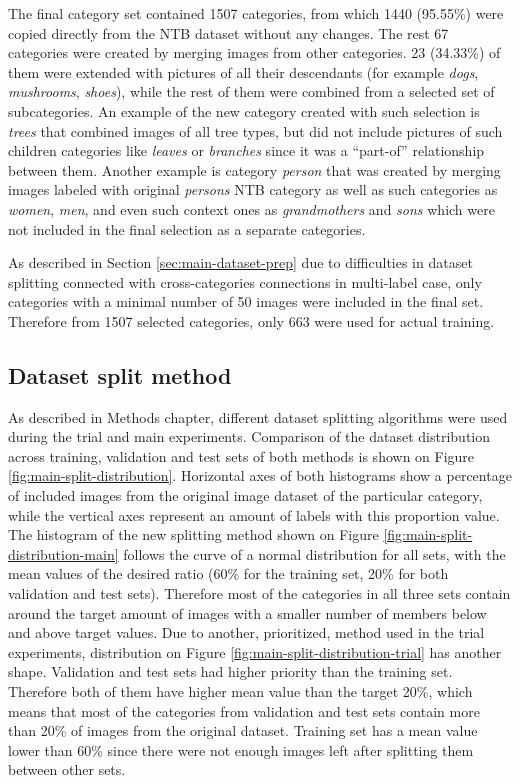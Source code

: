     The final category set contained 1507 categories, from which 1440 (95.55\%) were copied directly from the NTB dataset without any changes. The rest 67 categories were created by merging images from other categories. 23 (34.33\%) of them were extended with pictures of all their descendants (for example \textit{dogs}, \textit{mushrooms}, \textit{shoes}), while the rest of them were combined from a selected set of subcategories. An example of the new category created with such selection is \textit{trees} that combined images of all tree types, but did not include pictures of such children categories like \textit{leaves} or \textit{branches} since it was a ``part-of'' relationship between them. Another example is category \textit{person} that was created by merging images labeled with original \textit{persons} NTB category as well as such categories as \textit{women}, \textit{men}, and even such context ones as \textit{grandmothers} and \textit{sons} which were not included in the final selection as a separate categories.
    
    As described in Section \ref{sec:main-dataset-prep} due to difficulties in dataset splitting connected with cross-categories connections in multi-label case, only categories with a minimal number of 50 images were included in the final set. Therefore from 1507 selected categories, only 663 were used for actual training.

\subsection{Dataset split method}
    \label{sec:split-comparison}
    As described in Methods chapter, different dataset splitting algorithms were used during the trial and main experiments. Comparison of the dataset distribution across training, validation and test sets of both methods is shown on Figure \ref{fig:main-split-distribution}. Horizontal axes of both histograms show a percentage of included images from the original image dataset of the particular category, while the vertical axes represent an amount of labels with this proportion value. The histogram of the new splitting method shown on Figure \ref{fig:main-split-distribution-main} follows the curve of a normal distribution for all sets, with the mean values of the desired ratio (60\% for the training set, 20\% for both validation and test sets). Therefore most of the categories in all three sets contain around the target amount of images with a smaller number of members below and above target values. Due to another, prioritized, method used in the trial experiments, distribution on Figure \ref{fig:main-split-distribution-trial} has another shape. Validation and test sets had higher priority than the training set. Therefore both of them have higher mean value than the target 20\%, which means that most of the categories from validation and test sets contain more than 20\% of images from the original dataset. Training set has a mean value lower than 60\% since there were not enough images left after splitting them between other sets.
    
